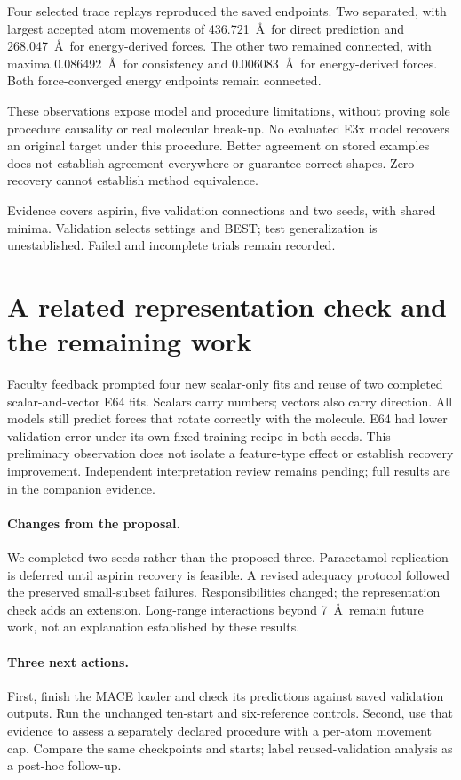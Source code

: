 \documentclass{article}
\begin{document}
Four selected trace replays reproduced the saved endpoints. Two separated, with largest accepted atom movements of 436.721~\AA\ for direct prediction and 268.047~\AA\ for energy-derived forces. The other two remained connected, with maxima 0.086492~\AA\ for consistency and 0.006083~\AA\ for energy-derived forces. Both force-converged energy endpoints remain connected.

These observations expose model and procedure limitations, without proving sole procedure causality or real molecular break-up.
No evaluated E3x model recovers an original target under this procedure. Better agreement on stored examples does not establish agreement everywhere or guarantee correct shapes. Zero recovery cannot establish method equivalence.

Evidence covers aspirin, five validation connections and two seeds, with shared minima. Validation selects settings and BEST; test generalization is unestablished. Failed and incomplete trials remain recorded.

\section{A related representation check and the remaining work}
Faculty feedback prompted four new scalar-only fits and reuse of two completed scalar-and-vector E64 fits. Scalars carry numbers; vectors also carry direction. All models still predict forces that rotate correctly with the molecule. E64 had lower validation error under its own fixed training recipe in both seeds. This preliminary observation does not isolate a feature-type effect or establish recovery improvement. Independent interpretation review remains pending; full results are in the companion evidence.

\paragraph{Changes from the proposal.}
We completed two seeds rather than the proposed three. Paracetamol replication is deferred until aspirin recovery is feasible. A revised adequacy protocol followed the preserved small-subset failures. Responsibilities changed; the representation check adds an extension. Long-range interactions beyond 7~\AA\ remain future work, not an explanation established by these results.
\paragraph{Three next actions.}
First, finish the MACE loader and check its predictions against saved validation outputs. Run the unchanged ten-start and six-reference controls. Second, use that evidence to assess a separately declared procedure with a per-atom movement cap. Compare the same checkpoints and starts; label reused-validation analysis as a post-hoc follow-up.
\end{document}
